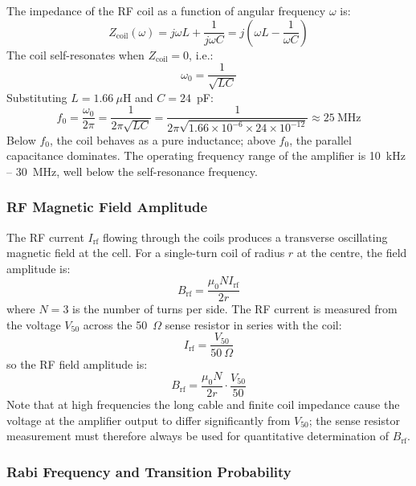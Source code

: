The impedance of the RF coil as a function of angular frequency $\omega$ is:
\begin{equation}
    Z_{\text{coil}}(\omega) = j\omega L + \frac{1}{j\omega C}
    = j\left(\omega L - \frac{1}{\omega C}\right)
\end{equation}
The coil self-resonates when $Z_{\text{coil}} = 0$, i.e.:
\begin{equation}
    \omega_0 = \frac{1}{\sqrt{LC}}
\end{equation}
Substituting $L = 1.66\ \mu$H and $C = 24$~pF:
\begin{equation}
    f_0 = \frac{\omega_0}{2\pi} = \frac{1}{2\pi\sqrt{LC}}
        = \frac{1}{2\pi\sqrt{1.66\times10^{-6}\times24\times10^{-12}}}
        \approx 25\ \text{MHz}
\end{equation}
Below $f_0$, the coil behaves as a pure inductance; above $f_0$, the parallel
capacitance dominates. The operating frequency range of the amplifier is
10~kHz -- 30~MHz, well below the self-resonance frequency.
 
\subsubsection*{RF Magnetic Field Amplitude}
 
The RF current $I_{\text{rf}}$ flowing through the coils produces a transverse
oscillating magnetic field at the cell. For a single-turn coil of radius $r$ at the
centre, the field amplitude is:
\begin{equation}
    B_{\text{rf}} = \frac{\mu_0 N I_{\text{rf}}}{2r}
\end{equation}
where $N = 3$ is the number of turns per side. The RF current is measured from the
voltage $V_{50}$ across the 50~$\Omega$ sense resistor in series with the coil:
\begin{equation}
    I_{\text{rf}} = \frac{V_{50}}{50\ \Omega}
\end{equation}
so the RF field amplitude is:
\begin{equation}
    B_{\text{rf}} = \frac{\mu_0 N}{2r} \cdot \frac{V_{50}}{50}
\end{equation}
Note that at high frequencies the long cable and finite coil impedance cause the voltage
at the amplifier output to differ significantly from $V_{50}$; the sense resistor
measurement must therefore always be used for quantitative determination of
$B_{\text{rf}}$.
 
\subsubsection*{Rabi Frequency and Transition Probability}
 
